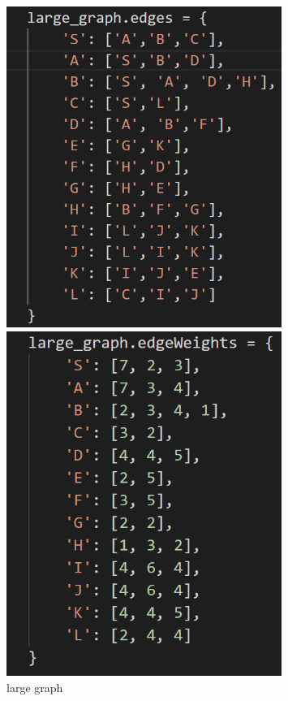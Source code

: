 \documentclass[aps,letterpaper,10pt]{revtex4}
\begin{document}
\begin{figure}[h]
	\begin{minipage}[c]{0.4\textwidth} %
		\centering
		\includegraphics[width=0.8\textwidth]{large_graph_UCS.png} %
	\end{minipage}%
	\begin{minipage}[c]{0.4\textwidth} %
		\centering
		\includegraphics[width=0.8\textwidth]{large_graph_UCS_visual.png} %
		
	\end{minipage}%
	\caption{large graph}
\end{figure}
\end{document}
